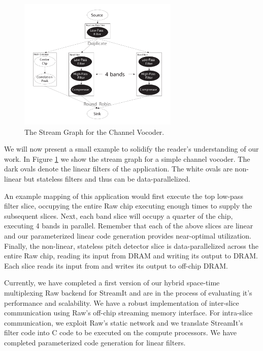 \documentclass{csailabstractbook}
\begin{document}
\begin{figure}[tbh]
	\vspace{-.2in}
  \centerline{\includegraphics[width=3.0in]{mgordon_figure1.pdf}}
	\vspace{-.2in}
  \caption{The Stream Graph for the Channel Vocoder.}
	\vspace{-.2in}
  \label{streamgraph}
\end{figure}


   
We will now present a small example to solidify the reader's
understanding of our work.  In Figure \ref{streamgraph} we show the
stream graph for a simple channel vocoder.  The dark ovals denote
the linear filters of the application.  The white ovals are non-linear
but stateless filters and thus can be data-parallelized.  

An example mapping of this application would first execute the top
low-pass filter slice, occupying the entire Raw chip executing enough
times to supply the subsequent slices. Next, each band slice will
occupy a quarter of the chip, executing 4 bands in parallel.  Remember
that each of the above slices are linear and our parameterized linear
code generation provides near-optimal utilization. Finally, the
non-linear, stateless pitch detector slice is data-parallelized across
the entire Raw chip, reading its input from DRAM and writing its
output to DRAM.  Each slice reads its input from and writes its output
to off-chip DRAM.
 
Currently, we have completed a first version of our hybrid space-time
multiplexing Raw backend for StreamIt and are in the process of
evaluating it's performance and scalability.  We have a robust
implementation of inter-slice communication using Raw's off-chip
streaming memory interface.  For intra-slice communication, we exploit
Raw's static network and we translate StreamIt's filter code into C
code to be executed on the compute processors.  We have completed
parameterized code generation for linear filters.   
\end{document}
